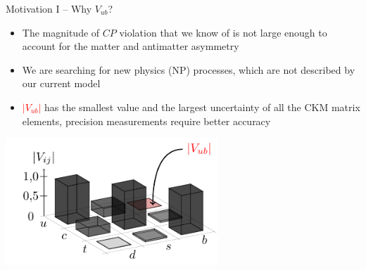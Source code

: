 \documentclass[serif]{beamer}
\begin{document}
\begin{frame}[t]{Motivation I -- Why $V_{ub}$?}
\small
\vspace{-3mm}
\begin{block}{}
	\begin{itemize}
		\item The magnitude of $CP$ violation that we know of is not large enough to account for the matter and antimatter asymmetry
		\item We are searching for new physics (NP) processes, which are not described by our current model
		\item \textcolor{red}{$\vert V_{ub}\vert$} has the smallest value and the largest uncertainty of all the CKM matrix elements, precision measurements require better accuracy
	\end{itemize}
\end{block}

\begin{center}
	\includegraphics[width=0.6\textwidth]{texfig/fig_CKM}
\end{center}


\end{frame}


\end{document}
